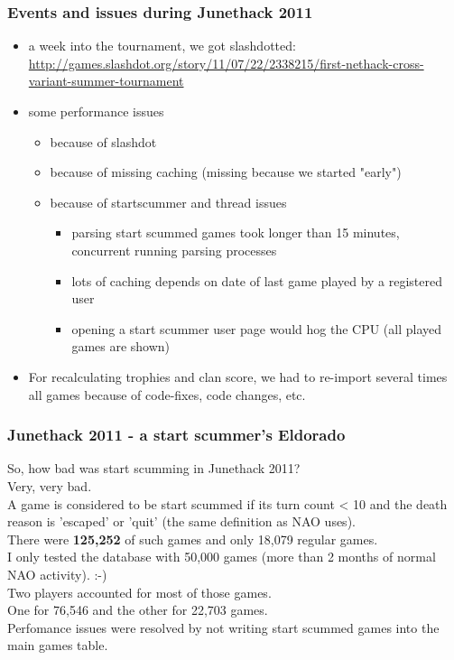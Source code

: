 \documentclass[handout]{beamer}
\begin{document}
\begin{frame}
\frametitle{Events and issues during Junethack 2011}
  \pause
  \begin{itemize}[<+->]
    \item a week into the tournament, we got slashdotted: \url{http://games.slashdot.org/story/11/07/22/2338215/first-nethack-cross-variant-summer-tournament}
    \item some performance issues
    \begin{itemize}[<+->]
      \item because of slashdot
      \item because of missing caching (missing because we started "early")
      \item because of startscummer and thread issues
      \begin{itemize}[<+->]
        \item parsing start scummed games took longer than 15 minutes, concurrent running parsing processes
        \item lots of caching depends on date of last game played by a registered user
        \item opening a start scummer user page would hog the CPU (all played games are shown)
      \end{itemize}
    \end{itemize}
    \item For recalculating trophies and clan score, we had to re-import several times all games because of code-fixes, code changes, etc.
  \end{itemize}
\end{frame}

\begin{frame}
\frametitle{Junethack 2011 - a start scummer's Eldorado}
  So, how bad was start scumming in Junethack 2011?\pause\\
  Very, very bad.\pause\\
  A game is considered to be start scummed if its turn count < 10 and the death reason is 'escaped' or 'quit' (the same definition as NAO uses).\pause\\
  There were \textbf{125,252} of such games and only 18,079 regular games.\pause\\
  I only tested the database with 50,000 games (more than 2 months of normal NAO activity). :-)\pause\\
  Two players accounted for most of those games.\pause\\
  One for 76,546 and the other for 22,703 games.\pause\\
  Perfomance issues were resolved by not writing start scummed games into the main games table.
\end{frame}
\end{document}
